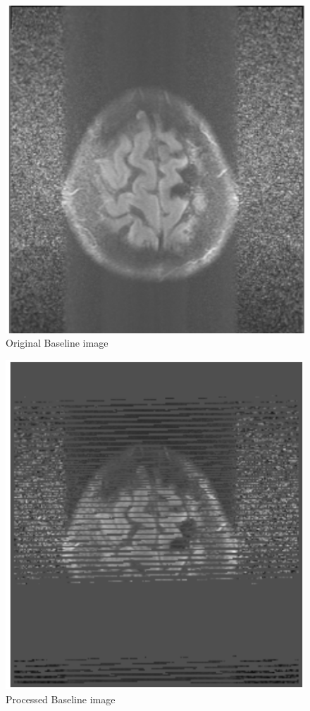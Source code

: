 \documentclass[conference]{IEEEtran}
\begin{document}
\newpage
\begin{figure}[h!]
\caption{Original Baseline image}
\includegraphics[scale = 0.34]{Snipaste_2018-05-28_14-39-56.png} 
\centering 
\end{figure}
\begin{figure}[h!]
\centering 
\caption{Processed Baseline image}
\includegraphics[scale = 0.34]{Snipaste_2018-05-28_14-40-00.png}
\end{figure}
\end{document}

